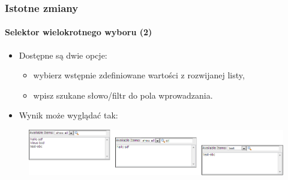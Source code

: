 \begin{frame}[fragile]
	\frametitle{Istotne zmiany}
	\framesubtitle{Selektor wielokrotnego wyboru (2)}

	\begin{itemize}
		\item Dostępne są dwie opcje:

			\begin{itemize}
				\item wybierz wstępnie zdefiniowane wartości z rozwijanej listy,
				\item wpisz szukane słowo/filtr do pola wprowadzania.
			\end{itemize}

		\item Wynik może wyglądać tak:
	\end{itemize}

	\begin{figure}
		\includegraphics[width=1\linewidth]{Images/InDepthChanges/MultipleValueSelector.png}
	\end{figure}

\end{frame}



